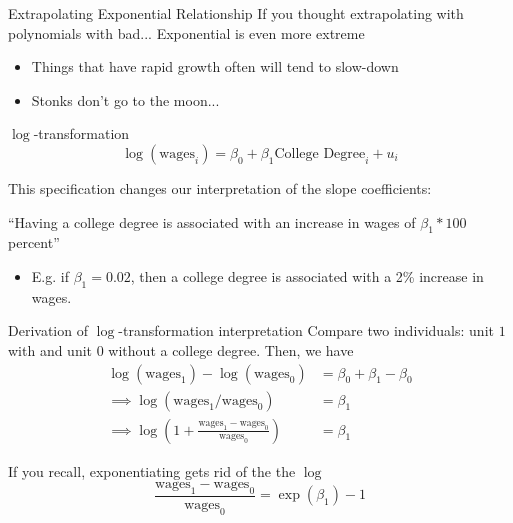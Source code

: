 \documentclass[aspectratio=169,t,11pt,table]{beamer}
\begin{document}
\begin{frame}{Extrapolating Exponential Relationship}
  If you thought extrapolating with polynomials with bad... Exponential is even more extreme
  \begin{itemize}
    \item Things that have rapid growth often will tend to slow-down
    
    \item Stonks don't go to the moon...
  \end{itemize}
\end{frame}


\begin{frame}{$\log$-transformation}
  \vspace*{-\bigskipamount}
  $$
    \log(\text{wages}_i) = \beta_0 + \beta_1 \text{College Degree}_i + u_i
  $$

  \bigskip
  This specification changes our interpretation of the slope coefficients:

  \begin{tcolorbox}[boxrule = 0pt, frame hidden, sharp corners, enhanced, borderline west = {2pt}{0pt}{zinc600}, interior hidden]
    ``Having a college degree is associated with an increase in wages of $\beta_1 * 100$ percent''
  \end{tcolorbox}
  
  \begin{itemize}
    \item E.g. if $\beta_1 = 0.02$, then a college degree is associated with a 2\% increase in wages.
  \end{itemize}

\end{frame}

\begin{frame}{Derivation of $\log$-transformation interpretation}
  Compare two individuals: unit $1$ with and unit $0$ without a college degree. Then, we have 
  \begin{align*}
    \log(\text{wages}_1) - \log(\text{wages}_0) &= 
    \beta_0 + \beta_1 - \beta_0 \\[1em]
    \implies \log(\text{wages}_1 / \text{wages}_0) &= \beta_1 \\[1em]
    \implies \log(1 + \frac{\text{wages}_1 - \text{wages}_0}{\text{wages}_0}) &= \beta_1
  \end{align*}

  \pause
  \bigskip
  If you recall, exponentiating gets rid of the the $\log$
  $$
    \frac{\text{wages}_1 - \text{wages}_0}{\text{wages}_0} = \exp(\beta_1) - 1
  $$
\end{frame}
\end{document}
